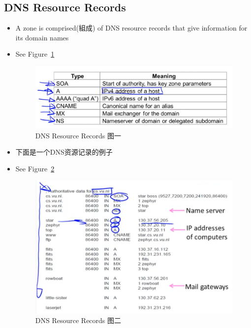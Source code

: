 \documentclass[12pt]{ctexart}   %
\begin{document}
	 \subsection{DNS Resource Records}
	 \begin{itemize}
	 	\item A zone is comprised(組成) of DNS resource records that give information for its domain names
	 	\item See Figure~\ref{fig:8-2-5}
		  
		 \begin{figure}[h!] %
		\centering
		 \includegraphics[scale=0.7]{images/8-2-5}
		\caption{ DNS Resource Records 图一 }
		 \label{fig:8-2-5}
		 \end{figure}
		 
		 \item 下面是一个DNS资源记录的例子
		 \item See Figure~\ref{fig:8-2-6}
		  
		 \begin{figure}[h!] %
		\centering
		 \includegraphics[scale=0.7]{images/8-2-6}
		\caption{ DNS Resource Records 图二 }
		 \label{fig:8-2-6}
		 \end{figure}
	 \end{itemize}
	
\end{document}
